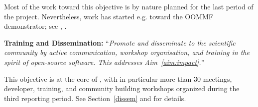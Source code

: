 \begin{compactenum}[\bf {Obj} 1\rm]
  Most of the work toward this objective is by nature planned for the last period of the \pn
  project. Nevertheless, work has started e.g. toward the OOMMF demonstrator; see
  ,
  .

\item \label{objective:disseminate}
  \textbf{Training and Dissemination:}
  ``\emph{Promote and disseminate
    \ODK to the scientific community by active communication,
    workshop organisation, and training in the spirit of open-source
    software. This addresses Aim~\ref{aim:impact}.}''

  This objective is at the core of , with in particular
  more than 30 meetings, developer, training, and community building
  workshops organized during the third reporting period. See
  Section~\ref{dissem} and  for
  details.
\end{compactenum}


